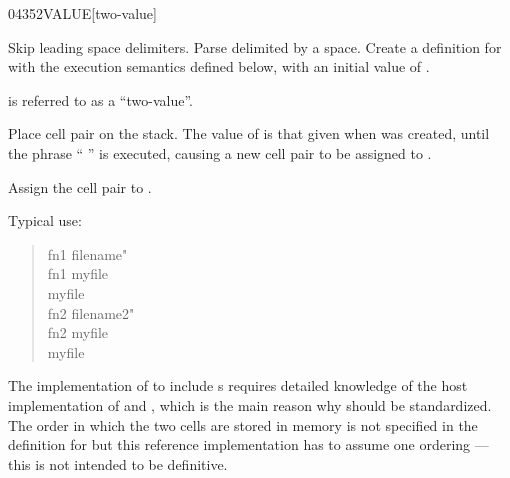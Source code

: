 
\enlargethispage{6ex}
\begin{worddef}{0435}{2VALUE}[two-value]%
\item {}

	Skip leading space delimiters.  Parse  delimited by a
	space.  Create a definition for  with the execution
	semantics defined below, with an initial value of .

	 is referred to as a ``two-value''.

\execute[name]

	Place cell pair  on the stack.  The value of
	 is that given when  was created,
	until the phrase ``  '' is
	executed, causing a new cell pair  to be assigned
	to .


	Assign the cell pair  to .


	\begin{rationale} %
		Typical use:
		\begin{quote}\ttfamily
			\word{:} fn1  filename" \word{;} \\
			fn1  myfile \\
			myfile  \\[2ex]
			\word{:} fn2  filename2" \word{;} \\
			fn2  myfile \\
			myfile 
		\end{quote}
	\end{rationale}

	\begin{implement} %
		\dffamily
		The implementation of  to include s
		requires detailed knowledge of the host implementation of
		 and , which is the main reason why
		 should be standardized.  The order in which
		the two cells are stored in memory is not specified in the
		definition for  but this reference implementation
		has to assume one ordering --- this is not intended to be
		definitive.


\end{implement}
\end{worddef}
